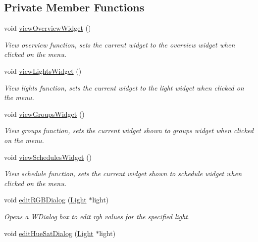 \subsection*{Private Member Functions}
\begin{DoxyCompactItemize}
\item 
void \hyperlink{classLightManagementWidget_ae2c05678777e26cc117dc9e3b1e6d482}{view\+Overview\+Widget} ()
\begin{DoxyCompactList}\small\item\em View overview function, sets the current widget to the overview widget when clicked on the menu. \end{DoxyCompactList}\item 
void \hyperlink{classLightManagementWidget_acd9a32efacbccb61424056839748c283}{view\+Lights\+Widget} ()
\begin{DoxyCompactList}\small\item\em View lights function, sets the current widget to the light widget when clicked on the menu. \end{DoxyCompactList}\item 
void \hyperlink{classLightManagementWidget_a0ba71461f9463f07373bafff62ce017e}{view\+Groups\+Widget} ()
\begin{DoxyCompactList}\small\item\em View groups function, sets the current widget shown to groups widget when clicked on the menu. \end{DoxyCompactList}\item 
void \hyperlink{classLightManagementWidget_a62809bb5bcf8a5a87ed248d9c5880a6c}{view\+Schedules\+Widget} ()
\begin{DoxyCompactList}\small\item\em View schedule function, sets the current widget shown to schedule widget when clicked on the menu. \end{DoxyCompactList}\item 
void \hyperlink{classLightManagementWidget_a7b49494c162f4e9703469d6519e0dc0a}{edit\+R\+G\+B\+Dialog} (\hyperlink{classLight}{Light} $\ast$light)
\begin{DoxyCompactList}\small\item\em Opens a W\+Dialog box to edit rgb values for the specified light. \end{DoxyCompactList}\item 
void \hyperlink{classLightManagementWidget_a36006718c829f0bbd6c2063dded822bc}{edit\+Hue\+Sat\+Dialog} (\hyperlink{classLight}{Light} $\ast$light)

\end{DoxyCompactItemize}
